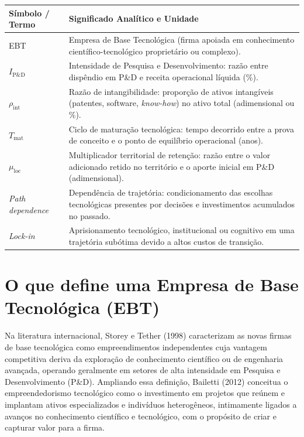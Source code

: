 
\begin{boxSimbolo}
\begin{tabularx}{\linewidth}{@{}l X@{}}
  \toprule
  \textbf{Símbolo / Termo} & \textbf{Significado Analítico e Unidade} \\
  \midrule
  EBT & Empresa de Base Tecnológica (firma apoiada em conhecimento científico-tecnológico proprietário ou complexo). \\
  $I_{\text{P\&D}}$ & Intensidade de Pesquisa e Desenvolvimento: razão entre dispêndio em P\&D e receita operacional líquida (\%). \\
  $\rho_{\text{int}}$ & Razão de intangibilidade: proporção de ativos intangíveis (patentes, software, \textit{know-how}) no ativo total (adimensional ou \%). \\
  $T_{\text{mat}}$ & Ciclo de maturação tecnológica: tempo decorrido entre a prova de conceito e o ponto de equilíbrio operacional (anos). \\
  $\mu_{\text{loc}}$ & Multiplicador territorial de retenção: razão entre o valor adicionado retido no território e o aporte inicial em P\&D (adimensional). \\
  \textit{Path dependence} & Dependência de trajetória: condicionamento das escolhas tecnológicas presentes por decisões e investimentos acumulados no passado. \\
  \textit{Lock-in} & Aprisionamento tecnológico, institucional ou cognitivo em uma trajetória subótima devido a altos custos de transição. \\
  \bottomrule
\end{tabularx}
\end{boxSimbolo}

\section{O que define uma Empresa de Base Tecnológica (EBT)}

Na literatura internacional, Storey e Tether (1998) caracterizam as novas firmas de base tecnológica como empreendimentos independentes cuja vantagem competitiva deriva da exploração de conhecimento científico ou de engenharia avançada, operando geralmente em setores de alta intensidade em Pesquisa e Desenvolvimento (P\&D). Ampliando essa definição, Bailetti (2012) conceitua o empreendedorismo tecnológico como o investimento em projetos que reúnem e implantam ativos especializados e indivíduos heterogêneos, intimamente ligados a avanços no conhecimento científico e tecnológico, com o propósito de criar e capturar valor para a firma.

